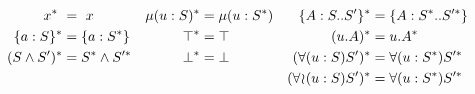 \begin{align*}
    x^{*} \                     &= \ x
        & \mu(u : S)^{*}        &= \mu(u : S^{*})
        & \{A : S .. S'\}^{*}   &= \{A : S^{*} .. S'^{*}\} \\
    \{a : S\}^{*}             &= \{a : S^{*}\}
        & \top^{*}              &= \top
        & (u.A)^{*}             &= u.A^{*}                     \\
    (S \wedge S')^{*}           &= S^{*} \wedge S'^{*}
        & \bot^{*}              &= \bot
        & (\forall(u:S)S')^{*} &= \forall(u:S^{*})S'^{*} \\
    & & & & (\forall\!\wr\!(u:S)S')^{*} &= \forall(u:S^{*})S'^{*} \\
\end{align*}
